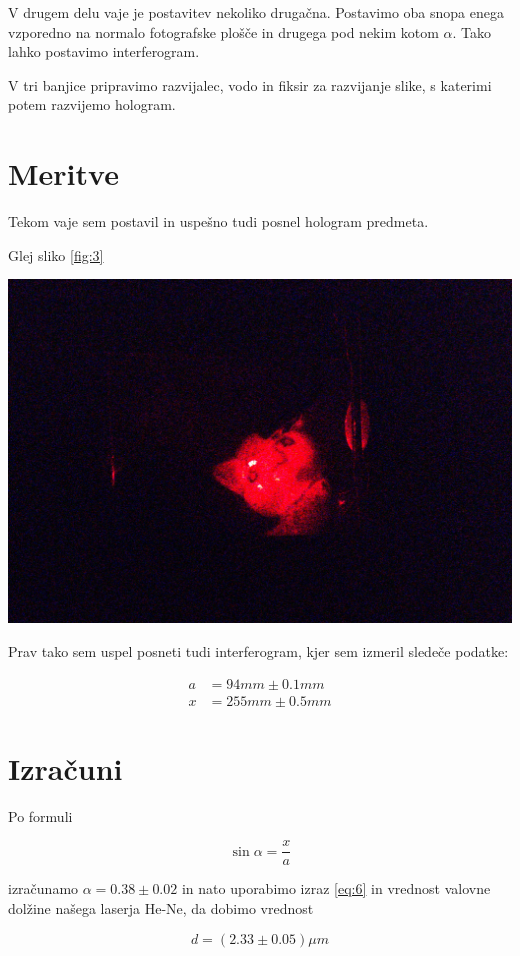 \documentclass[11pt]{article}
\begin{document}
V drugem delu vaje je postavitev nekoliko drugačna. Postavimo oba snopa enega vzporedno na normalo fotografske plošče in drugega pod nekim kotom \(\alpha\). Tako lahko postavimo interferogram.

V tri banjice pripravimo razvijalec, vodo in fiksir za razvijanje slike, s katerimi potem razvijemo hologram.
\section{Meritve}
\label{sec:org1bd5112}

Tekom vaje sem postavil in uspešno tudi posnel hologram predmeta.

Glej sliko \ref{fig:3}

\begin{center}\label{fig:3}
\includegraphics[width=.9\linewidth]{20241015_131245(1).jpg}
\end{center}

Prav tako sem uspel posneti tudi interferogram, kjer sem izmeril sledeče podatke:

\begin{align} \label{al:1}
a &= 94 mm \pm 0.1 mm \\
x &= 255 mm \pm 0.5 mm
\end{align}
\section{Izračuni}
\label{sec:org51bb9fd}

Po formuli

\begin{equation}
\label{eq:7}
\sin \alpha = \frac{x}{a}
\end{equation}

izračunamo \(\alpha = 0.38 \pm 0.02\) in nato uporabimo izraz \ref{eq:6} in vrednost valovne dolžine našega laserja He-Ne, da dobimo vrednost

\[
d = (2.33 \pm 0.05) \mu m
\]
\end{document}
